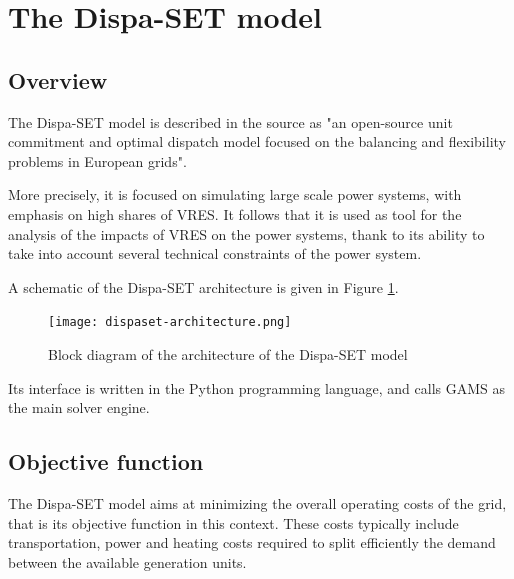 \section{The Dispa-SET model}

\subsection{Overview}

The Dispa-SET model \cite{dispaset} is described in the source \cite{dispaset2} as "an open-source unit commitment and optimal dispatch model focused on the balancing and flexibility problems in European grids".

More precisely, it is focused on simulating large scale power systems, with emphasis on high shares of VRES. It follows that it is used as tool for the analysis of the impacts of VRES on the power systems, thank to its ability to take into account several technical constraints of the power system.

A schematic of the Dispa-SET architecture is given in Figure \ref{dispaset-architecture}.

\begin{figure}[h]
    \texttt{[image: dispaset-architecture.png]}
    \caption{Block diagram of the architecture of the Dispa-SET model}
    \label{dispaset-architecture}
\end{figure}

Its interface is written in the Python programming language, and calls GAMS \cite{GAMS} as the main solver engine.

\subsection{Objective function}

The Dispa-SET model aims at minimizing the overall operating costs of the grid, that is its objective function in this context. These costs typically include transportation, power and heating costs required to split efficiently the demand between the available generation units.

